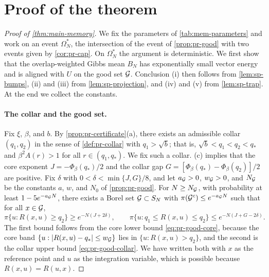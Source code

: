 \section{Proof of the theorem}\label{sec:mem-proof}

\begin{proof}[Proof of \cref{thm:main-memory}]
We fix the parameters of \cref{tab:mem-parameters} and work on an event $\Omega^*_N$, the intersection of the event of \cref{prop:pr-good} with two events given by \cref{cor:pr-cap}. On $\Omega^*_N$ the argument is deterministic. We first show that the overlap-weighted Gibbs mean $B_N$ has exponentially small vector energy and is aligned with $U$ on the good set $\mathcal G$. Conclusion (i) then follows from \cref{lem:sp-bumps}, (ii) and (iii) from \cref{lem:sp-projection}, and (iv) and (v) from \cref{lem:sp-trap}. At the end we collect the constants.

\paragraph{The collar and the good set.} Fix $\xi$, $\beta$, and $b$. By \cref{prop:pr-certificate}(a), there exists an admissible collar $(q_1,q_2)$ in the sense of \cref{def:pr-collar} with $q_1>\sqrt b$; that is, $\sqrt b<q_1<q_2<q_*$ and $\beta^2A(r)>1$ for all $r\in(q_1,q_*)$. We fix such a collar. (c) implies that the core exponent $J=-\Phi_\beta(q_*)/2$ and the collar gap $G=[\Phi_\beta(q_*)-\Phi_\beta(q_2)]/2$ are positive. Fix $\delta$ with $0<\delta<\min\{J,G\}/8$, and let $a_\mathcal G>0$, $w_\mathcal G>0$, and $N_\mathcal G$ be the constants $a$, $w$, and $N_0$ of \cref{prop:pr-good}. For $N\ge N_\mathcal G$, with probability at least $1-5e^{-a_\mathcal G N}$, there exists a Borel set $\mathcal G\subset S_N$ with $\pi(\mathcal G^c)\le e^{-a_\mathcal G N}$ such that for all $x\in\mathcal G$,
\begin{equation}\label{eq:mem-good}
\pi\{u:R(x,u)\ge q_2\}\ge e^{-N(J+2\delta)},
\qquad
\pi\{u:q_1\le R(x,u)\le q_2\}\le e^{-N(J+G-2\delta)}.
\end{equation}
The first bound follows from the core lower bound \eqref{eq:pr-good-core}, because the core band $\{u:\left|R(x,u)-q_*\right|\le w_\mathcal G\}$ lies in $\{u:R(x,u)>q_2\}$, and the second is the collar upper bound \eqref{eq:pr-good-collar}. We have written both with $x$ as the reference point and $u$ as the integration variable, which is possible because $R(x,u)=R(u,x)$.


\end{proof}
